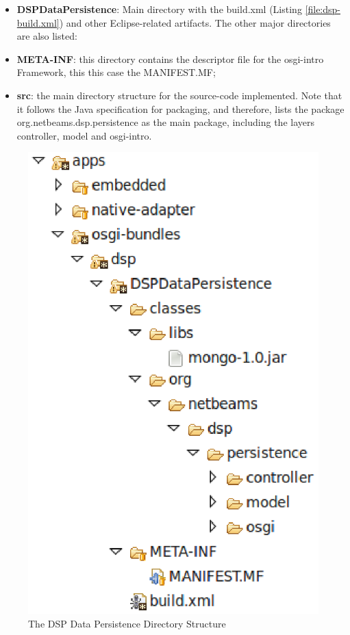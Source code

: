 \begin{itemize}
  \item \textbf{DSPDataPersistence}: Main directory with the build.xml (Listing
  \ref{file:dsp-build.xml}) and other Eclipse-related artifacts. The other
  major directories are also listed:
  \item \textbf{META-INF}: this directory contains the descriptor file for
  the osgi-intro Framework, this this case the MANIFEST.MF;
  \item \textbf{src}: the main directory structure for the source-code
  implemented. Note that it follows the Java specification for packaging, and
  therefore, lists the package org.netbeams.dsp.persistence as the main
  package, including the layers controller, model and osgi-intro.
\end{itemize}

\begin{figure}[!h]
  \centering
  \includegraphics[scale=0.5]{../diagrams/dsp-data-persistence-dir-checkedout}
  \caption{The DSP Data Persistence Directory Structure}
  \label{fig:dsp-data-persistence-dir-checkedout}
\end{figure}

